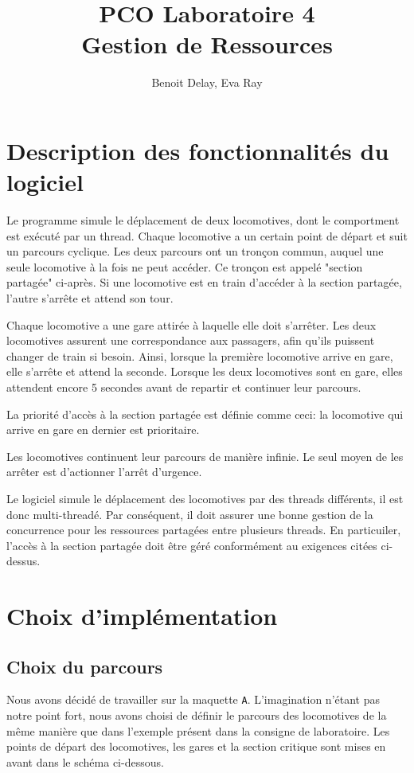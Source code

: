\documentclass{article}
\title{PCO Laboratoire 4 \\
\large Gestion de Ressources}
\author{Benoit Delay, Eva Ray}
\begin{document}
\maketitle

\section*{Description des fonctionnalités du logiciel}

Le programme simule le déplacement de deux locomotives, dont le comportment est exécuté par un thread. 
Chaque locomotive a un certain point de départ et suit un parcours cyclique. Les deux
parcours ont un tronçon commun, auquel une seule locomotive à la fois ne peut accéder. Ce tronçon est appelé "section partagée" ci-après. Si une
locomotive est en train d'accéder à la section partagée, l'autre s'arrête et attend son tour. 

\noindent
Chaque locomotive a une gare attirée à laquelle elle doit s'arrêter. Les deux locomotives assurent une correspondance aux passagers, 
afin qu'ils puissent changer de train si besoin. Ainsi, lorsque la première locomotive arrive en gare, elle s'arrête et attend la seconde. 
Lorsque les deux locomotives sont en gare, elles attendent encore 5 secondes avant de repartir et continuer leur parcours. 

\noindent
La priorité d'accès à la section partagée est définie comme ceci: la locomotive qui arrive en gare en dernier est prioritaire. 

\noindent
Les locomotives continuent leur parcours de manière infinie. Le seul moyen de les arrêter est d'actionner l'arrêt d'urgence. 

\noindent
Le logiciel simule le déplacement des locomotives par des threads différents, il est donc multi-threadé. Par conséquent, il doit 
assurer une bonne gestion de la concurrence pour les ressources partagées entre plusieurs threads. En particuiler, l'accès à la section
partagée doit être géré conformément au exigences citées ci-dessus. 

\section*{Choix d'implémentation}
\subsection*{Choix du parcours}
Nous avons décidé de travailler sur la maquette \texttt{A}. L'imagination n'étant pas notre point fort, nous avons choisi de définir le parcours des
locomotives de la même manière que dans l'exemple présent dans la consigne de laboratoire. Les points de départ des locomotives, les gares et la
section critique sont mises en avant dans le schéma ci-dessous. 
\end{document}
